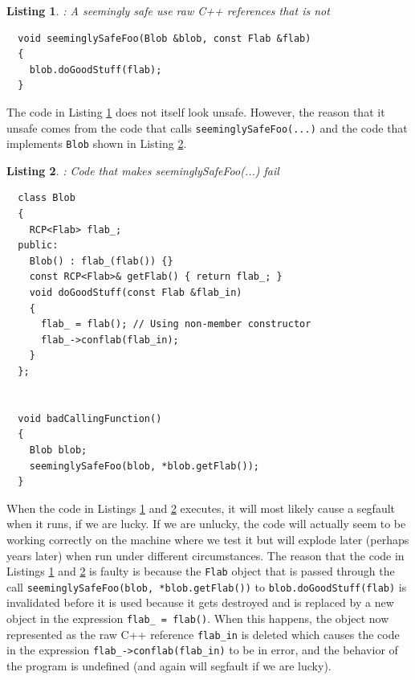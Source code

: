 \documentclass[pdf,ps2pdf,11pt]{SANDreport}
\newtheorem{listing}{Listing}
\begin{document}
\begin{listing}: A seemingly safe use raw C++ references that is not \\
\label{listing:unsafe_raw_C++_reference1}
{\small\begin{verbatim}
  void seeminglySafeFoo(Blob &blob, const Flab &flab)
  {
    blob.doGoodStuff(flab);
  }
\end{verbatim}}
\end{listing}

The code in Listing {}\ref{listing:unsafe_raw_C++_reference1} does not
itself look unsafe.  However, the reason that it unsafe comes from the
code that calls {}\texttt{seeminglySafeFoo(...)} and the code that
implements {}\texttt{Blob} shown in Listing
{}\ref{listing:unsafe_raw_C++_reference2}.

\begin{listing}: Code that makes seeminglySafeFoo(...) fail\\
\label{listing:unsafe_raw_C++_reference2}
{\small\begin{verbatim}
  class Blob
  {
    RCP<Flab> flab_;
  public:
    Blob() : flab_(flab()) {}
    const RCP<Flab>& getFlab() { return flab_; }
    void doGoodStuff(const Flab &flab_in)
    {
      flab_ = flab(); // Using non-member constructor
      flab_->conflab(flab_in);
    }
  };


  void badCallingFunction()
  {
    Blob blob;
    seeminglySafeFoo(blob, *blob.getFlab());
  }
\end{verbatim}}
\end{listing}

When the code in Listings {}\ref{listing:unsafe_raw_C++_reference1}
and {}\ref{listing:unsafe_raw_C++_reference2} executes, it will most
likely cause a segfault when it runs, if we are lucky.  If we are
unlucky, the code will actually seem to be working correctly on the
machine where we test it but will explode later (perhaps years later)
when run under different circumstances.  The reason that the code in
Listings {}\ref{listing:unsafe_raw_C++_reference1} and
{}\ref{listing:unsafe_raw_C++_reference2} is faulty is because the
{}\texttt{Flab} object that is passed through the call
{}\texttt{seeminglySafeFoo(blob, *blob.getFlab())} to
{}\texttt{blob.doGoodStuff(flab)} is invalidated before it is used
because it gets destroyed and is replaced by a new object in the
expression {}\texttt{flab\_ = flab()}.  When this happens, the object
now represented as the raw C++ reference {}\texttt{flab\_in} is
deleted which causes the code in the expression
{}\texttt{flab\_->conflab(flab\_in)} to be in error, and the behavior
of the program is undefined (and again will segfault if we are lucky).
\end{document}
